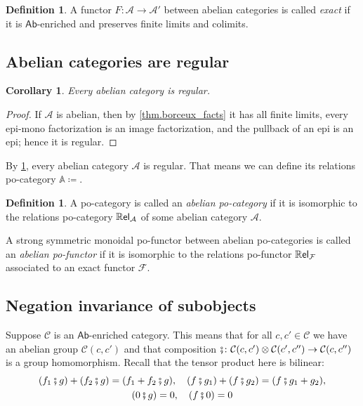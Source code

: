 \documentclass[11pt, oneside, article]{memoir}
\theoremstyle{plain}
\newtheorem{corollary}[theorem]{Corollary}
\theoremstyle{definition}
\newtheorem{definition}[theorem]{Definition}
\theoremstyle{remark}
\newcommand{\cat}[1]{\mathcal{#1}}%
\newcommand{\ccat}[1]{\mathbb{#1}}%
\newcommand{\Cat}[1]{{\mathsf{#1}}}%
\newcommand{\CCat}[1]{\mathbb{\StrLeft{#1}{1}}\Cat{\StrGobbleLeft{#1}{1}}}%
\newcommand{\funr}[1]{\mathcal{#1}}%
\newcommand{\ab}{\Cat{Ab}}
\newcommand{\cp}{\mathbin{\fatsemi}}
\newcommand{\rrel}[1]{\CCat{Rel}_{#1}}
\begin{document}
\begin{definition}
A functor $F\colon\cat{A}\to\cat{A}'$ between abelian categories is called \emph{exact} if it is $\ab$-enriched and preserves finite limits and colimits.
\end{definition}



\subsection{Abelian categories are regular}

\begin{corollary}\label{cor.abelian_imp_reg}
Every abelian category is regular.
\end{corollary}
\begin{proof}
If $\cat{A}$ is abelian, then by \cref{thm.borceux_facts} it has all finite limits, every epi-mono factorization is an image factorization, and the pullback of an epi is an epi; hence it is regular.
\end{proof}

By \cref{cor.abelian_imp_reg}, every abelian category $\cat{A}$ is regular. That means we can define its relations po-category $\ccat{A}\coloneqq$.

\begin{definition}\label{def.regular_pocat}
  A po-category is called an \emph{abelian po-category} if it is isomorphic to the relations po-category $\rrel{\cat{A}}$ of some abelian category $\cat{A}$.
  
  A strong symmetric monoidal po-functor between abelian po-categories is called
  an \emph{abelian po-functor} if it is isomorphic to the relations po-functor
  $\rrel{\funr{F}}$ associated to an exact functor $\funr{F}$.
\end{definition}


\subsection{Negation invariance of subobjects}

Suppose $\cat{C}$ is an $\ab$-enriched category. This means that for all $c,c'\in\cat{C}$ we have an abelian group $\cat{C}(c,c')$ and that composition $\cp\colon\cat{C}(c,c')\otimes\cat{C}(c',c'')\to\cat{C}(c,c'')$ is a group homomorphism. Recall that the tensor product here is bilinear:
\begin{gather*}
  (f_1\cp g)+(f_2\cp g)=(f_1+f_2\cp g),\quad
  (f\cp g_1)+(f\cp g_2)=(f\cp g_1+g_2),\\
  (0\cp g)=0,\quad
  (f\cp 0)=0
\end{gather*}
\end{document}
